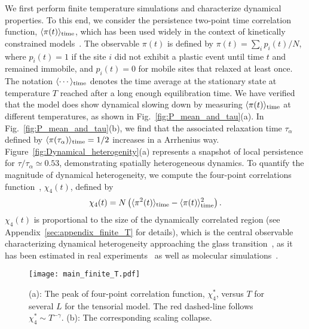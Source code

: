 \documentclass[pre,twocolumn,superscriptaddress,tightenlines,showpacs,longbibliography,floatfix,footinbib]{revtex4-1}
\begin{document}
We first perform finite temperature simulations and characterize dynamical properties.
To this end, we consider the persistence two-point time correlation function, $\langle \pi(t) \rangle_{\rm time}$, which has been used widely in the context of kinetically constrained models~\cite{ritort2003glassy}. The observable $\pi(t)$ is defined by $\pi(t) = \sum_i p_i(t)/N$,
where
$p_i(t)=1$ if the site $i$ did not exhibit a plastic event until time $t$ and remained immobile, and $p_i(t)=0$ for mobile sites that relaxed at least once. The notation 
$\langle \cdots \rangle_{\rm time}$ denotes the time average at the stationary state at temperature $T$ reached after a long enough equilibration time.
We have verified that the model does show dynamical slowing down by measuring $\langle \pi(t) \rangle_{\rm time}$ at different temperatures, as shown in Fig.~\ref{fig:P_mean_and_tau}(a).
In Fig.~\ref{fig:P_mean_and_tau}(b), we find that the associated relaxation time $\tau_\alpha$ defined by $\langle \pi(\tau_\alpha) \rangle_{\rm time}=1/2$ increases in a Arrhenius way. 
Figure~\ref{fig:Dynamical_heterogenity}(a) represents a snapshot of local persistence for $\tau/\tau_\alpha\simeq 0.53$, demonstrating spatially heterogeneous dynamics.
To quantify the magnitude 
of dynamical heterogeneity, we compute the four-point correlations function~\cite{donati2002theory}, $\chi_4(t)$, defined by
\begin{equation}
 \chi_4(t) = N \left( \langle \pi^2(t)\rangle_{\rm time} - \langle \pi(t) \rangle_{\rm time}^2 \right).   
\end{equation}
$\chi_4(t)$ is proportional to the size of the dynamically correlated region (see Appendix~\ref{sec:appendix_finite_T} for details), which is the central observable characterizing dynamical heterogeneity approaching the glass transition~\cite{berthier2011dynamical}, as it has been estimated in real experiments~\cite{berthier2005direct,dalle2007spatial,capaccioli2008dynamically,dauchot2022glass} as well as molecular simulations~\cite{donati2002theory,karmakar2009growing,coslovich2018dynamic}.



\begin{figure}
\centering
\texttt{[image: main\_finite\_T.pdf]}
\caption{(a): The peak of four-point correlation function, $\chi_4^{*}$, versus $T$ for several $L$ for the tensorial model. The red dashed-line follows $\chi_4^{*} \sim T^{-\gamma}$. (b): The corresponding scaling collapse.
}
\label{fig:main_finite_T}
\end{figure}
\end{document}
